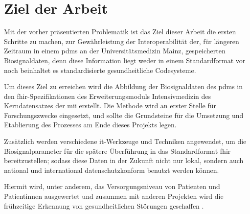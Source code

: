 \section{Ziel der Arbeit} \label{sec:goal}

Mit der vorher präsentierten Problematik ist das Ziel dieser Arbeit die ersten Schritte zu machen, zur Gewährleistung der Interoperabilität der, für längeren Zeitraum in einem \ac{pdms} an der Universitätsmedizin Mainz, gespeicherten Biosignaldaten, denn diese Information liegt weder in einem Standardformat vor noch beinhaltet es standardisierte gesundheitliche Codesysteme. 

Um dieses Ziel zu erreichen wird die Abbildung der Biosignaldaten des \ac{pdms} in den \ac{fhir}-Spezifikationen des Erweiterungsmoduls \glqq Intensivmedizin\grqq{} des Kerndatensatzes der \ac{mii} erstellt. Die Methode wird an erster Stelle für Forschungszwecke eingesetzt, und sollte die Grundsteine für die Umsetzung und Etablierung des Prozesses am Ende dieses Projekts legen. 

Zusätzlich werden verschiedene \ac{it}-Werkzeuge und Techniken angewendet, um die Biosignalparameter für die spätere Überführung in das Standardformat \ac{fhir} bereitzustellen; sodass diese Daten in der Zukunft nicht nur lokal, sondern auch national und international datenschutzkonform benutzt werden können. 

Hiermit wird, unter anderem, das Versorgungsniveau von Patienten und Patientinnen ausgewertet und zusammen mit anderen Projekten wird die frühzeitige Erkennung von gesundheitlichen Störungen geschaffen \cite{icukdz}.